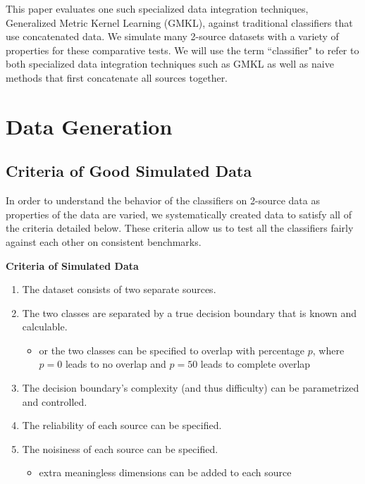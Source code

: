 \documentclass{article}
\begin{document}
This paper evaluates one such specialized data integration techniques,
Generalized Metric Kernel Learning (GMKL), against traditional classifiers that
use concatenated data. We simulate many 2-source datasets with a variety of
properties for these comparative tests. We will use the term ``classifier" to
refer to both specialized data integration techniques such as GMKL as well as
naive methods that first concatenate all sources together.












\section*{Data Generation}



\subsection*{Criteria of Good Simulated Data}

In order to understand the behavior of the classifiers on 2-source data as
properties of the data are varied, we systematically created data to satisfy
all of the criteria detailed below. These criteria allow us to test all
the classifiers fairly against each other on consistent benchmarks.
\newline

\begin{minipage}{\textwidth}
\centering
\textbf{Criteria of Simulated Data}
\begin{enumerate}
    \item The dataset consists of two separate sources.
    \item \label{itm:separable} The two classes are separated by a true
        decision boundary that is known and calculable.
    \begin{itemize}
        \item or the two classes can be specified to overlap with percentage
            $p$, where $p=0$ leads to no overlap and $p=50$ leads to complete
            overlap
    \end{itemize}
    \item The decision boundary's complexity (and thus difficulty) can be
        parametrized and controlled.
    \item The reliability of each source can be specified.
    \item The noisiness of each source can be specified.
    \begin{itemize}
        \item \label{itm:noisy} extra meaningless dimensions can be
            added to each source
    \end{itemize}
\end{enumerate}
\label{tab:criteria}
\end{minipage}
\end{document}
